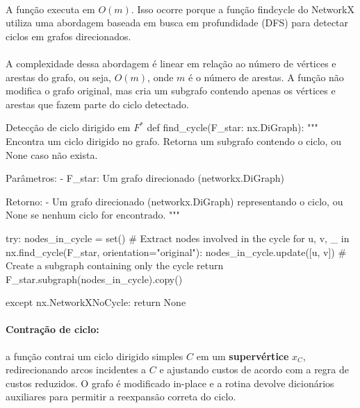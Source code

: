 \documentclass[12pt,a4paper]{article}
\def\texttt#1{#1}%
\def\emph#1{#1}%
\def\_{}%
\begin{document}
\paragraph{}
A função executa em \(O(m)\). Isso ocorre porque a função \texttt{find\_cycle} do NetworkX utiliza uma abordagem baseada em busca em profundidade (DFS) para detectar ciclos em grafos direcionados. 

\paragraph{}
A complexidade dessa abordagem é linear em relação ao número de vértices e arestas do grafo, ou seja, \(O(m)\), onde \(m\) é o número de arestas. A função não modifica o grafo original, mas cria um subgrafo contendo apenas os vértices e arestas que fazem parte do ciclo detectado.

\begin{pybox}{Detecção de ciclo dirigido em $F^*$}
def find_cycle(F_star: nx.DiGraph):
    """
    Encontra um ciclo dirigido no grafo.
    Retorna um subgrafo contendo o ciclo, ou None caso não exista.

    Parâmetros:
        - F_star: Um grafo direcionado (networkx.DiGraph)

    Retorno:
        - Um grafo direcionado (networkx.DiGraph) representando o ciclo, ou None se nenhum ciclo for encontrado.
    """

    try:
        nodes_in_cycle = set()
        # Extract nodes involved in the cycle
        for u, v, _ in nx.find_cycle(F_star, orientation="original"):
            nodes_in_cycle.update([u, v])
        # Create a subgraph containing only the cycle
        return F_star.subgraph(nodes_in_cycle).copy()

    except nx.NetworkXNoCycle:
        return None
\end{pybox}

\paragraph{Contração de ciclo:}
a função contrai um ciclo dirigido simples \(C\) em um \textbf{supervértice} \(x_C\), redirecionando arcos incidentes a \(C\) e ajustando custos de acordo com a regra de \emph{custos reduzidos}. O grafo é modificado \emph{in-place} e a rotina devolve dicionários auxiliares para permitir a \emph{reexpansão} correta do ciclo.
\end{document}
